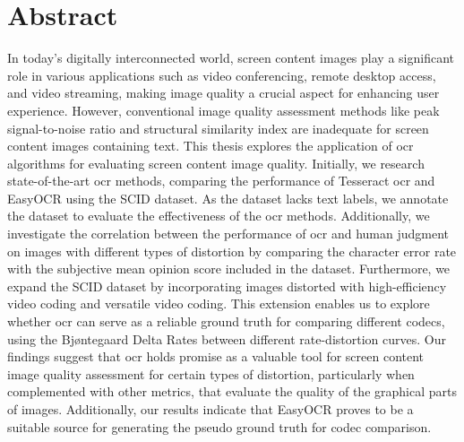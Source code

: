 \chapter{Abstract}

In today's digitally interconnected world, screen content images play a significant role in various applications such as video conferencing, remote desktop access, and video streaming, making image quality a crucial aspect for enhancing user experience.
However, conventional image quality assessment methods like peak signal-to-noise ratio and structural similarity index are inadequate for screen content images containing text.
This thesis explores the application of \gls{ocr} algorithms for evaluating screen content image quality.
Initially, we research state-of-the-art \gls{ocr} methods, comparing the performance of Tesseract \gls{ocr} and EasyOCR using the SCID dataset. 
As the dataset lacks text labels, we annotate the dataset to evaluate the effectiveness of the \gls{ocr} methods.
Additionally, we investigate the correlation between the performance of \gls{ocr} and human judgment on images with different types of distortion by comparing the character error rate with the subjective mean opinion score included in the dataset.
Furthermore, we expand the SCID dataset by incorporating images distorted with high-efficiency video coding and versatile video coding.
This extension enables us to explore whether \gls{ocr} can serve as a reliable ground truth for comparing different codecs, using the Bjøntegaard Delta Rates between different rate-distortion curves.
Our findings suggest that \gls{ocr} holds promise as a valuable tool for screen content image quality assessment for certain types of distortion, particularly when complemented with other metrics, that evaluate the quality of the graphical parts of images.
Additionally, our results indicate that EasyOCR proves to be a suitable source for generating the pseudo ground truth for codec comparison.
